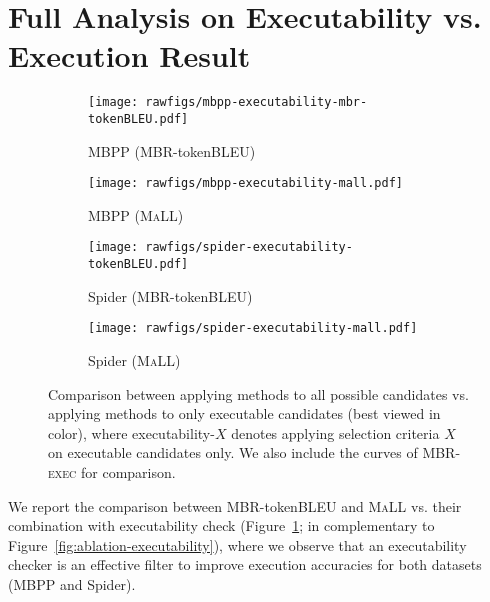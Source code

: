 \documentclass[11pt]{article}
\newcommand{\mbrexec}{\textsc{MBR-exec}\xspace}
\newcommand{\maxavglikelihood}{\textsc{MaLL}\xspace}
\begin{document}
\section{Full Analysis on Executability vs. Execution Result}
\label{appendix:full-executability}
\begin{figure}[t]
    \centering
    \begin{subfigure}[t]{0.45\textwidth}
        \texttt{[image: rawfigs/mbpp-executability-mbr-tokenBLEU.pdf]}
        \caption{MBPP (MBR-token\textsc{BLEU})}
    \end{subfigure}
    \hspace{-10pt}
    \begin{subfigure}[t]{0.45\textwidth}
        \texttt{[image: rawfigs/mbpp-executability-mall.pdf]}
        \caption{MBPP (\maxavglikelihood)}
    \end{subfigure}
    \hspace{-10pt}
    \begin{subfigure}[t]{0.45\textwidth}
        \texttt{[image: rawfigs/spider-executability-tokenBLEU.pdf]}
        \caption{Spider (MBR-token\textsc{BLEU})}
    \end{subfigure}
    \hspace{-10pt}
    \begin{subfigure}[t]{0.45\textwidth}
        \texttt{[image: rawfigs/spider-executability-mall.pdf]}
        \caption{Spider (\maxavglikelihood)}
    \end{subfigure}
    \caption{Comparison between applying methods to all possible candidates vs. applying methods to only executable candidates (best viewed in color), where executability-$X$ denotes applying selection criteria $X$ on executable candidates only. We also include the curves of \mbrexec for comparison.}
    \label{fig:ablation-executability-full}
\end{figure} We report the comparison between MBR-token\textsc{BLEU} and \maxavglikelihood vs. their combination with executability check (Figure~\ref{fig:ablation-executability-full}; in complementary to Figure~\ref{fig:ablation-executability}), where we observe that an executability checker is an effective filter to improve execution accuracies for both datasets (MBPP and Spider). 
\end{document}
